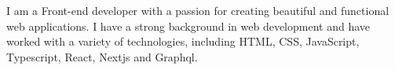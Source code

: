 
I am a Front-end developer with a passion for creating beautiful and functional web applications. I have a strong background in web development and have worked with a variety of technologies, including HTML, CSS, JavaScript, Typescript, React, Nextjs and Graphql.



\divider\smallskip



% 
% 
% 